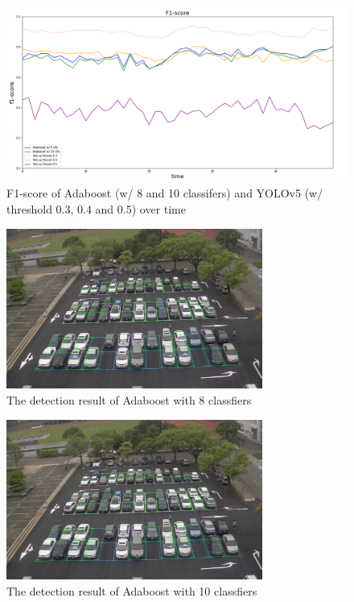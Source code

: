 \documentclass{article}[12pt, twocolumn]
\begin{document}
\begin{figure}[H]
    \centering
    \includegraphics[width=\textwidth]{figure/F1-score.png}
    \caption{F1-score of Adaboost (w/ 8 and 10 classifers)
    and YOLOv5 (w/ threshold 0.3, 0.4 and 0.5) over time}
    \label{fig:F1}
\end{figure}

\begin{figure}[H]
    \centering
    \includegraphics[width=0.75\textwidth]{figure/Adaboost_first_frame_8.png}
    \caption{The detection result of Adaboost with 8 classfiers}
\end{figure}

\begin{figure}[H]
    \centering
    \includegraphics[width=0.75\textwidth]{figure/Adaboost_first_frame_10.png}
    \caption{The detection result of Adaboost with 10 classfiers}
\end{figure}
\end{document}
